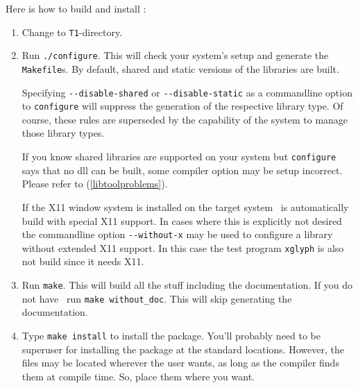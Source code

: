 Here is how to build and install \tonelib:
\begin{enumerate}
\item Change to \verb+T1+-directory.
\item Run \verb+./configure+. This will check your system's setup and generate
  the \verb+Makefile+s. By default, shared and static versions of the
  libraries are built.

  Specifying \verb+--disable-shared+ or \verb+--disable-static+ as a
  commandline option to \verb+configure+ will suppress the generation of the
  respective library type. Of course, these rules are superseded by the
  capability of the system to manage those library types.

  If you know shared libraries are supported on your system but
  \verb+configure+ says that no dll can be built, some compiler option
  may be setup incorrect. Please refer to (\ref{libtoolproblems}). 

  If the X11 window system is installed on the target system \tonelib\ is
  automatically build with special X11 support. In cases where this is
  explicitly not desired the commandline option 
  \verb+--without-x+ may be used to configure a library without extended X11
  support. In this case the test program \verb+xglyph+ is also not build since
  it needs X11.
\item Run \verb+make+. This will build all the stuff including the
  documentation. If you do not have \LaTeXe\, run 
  \verb+make without_doc+. This will skip generating the documentation. 
\item Type \verb+make install+ to install the package. You'll
  probably need to be superuser for installing the package at the standard
  locations. However, the files may be
  located wherever the user wants, as long as the compiler
  finds them at compile time. So, place them where you want. 


\end{enumerate}
